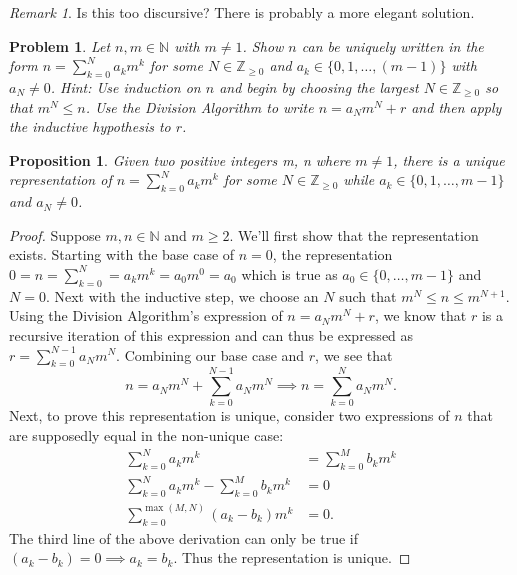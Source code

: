 \documentclass[12pt]{article}
\newtheorem*{prop}{Proposition}
\newtheorem{problem}{Problem}
\theoremstyle{remark}  %
\newtheorem*{remark}{Remark}
\begin{document}
    \begin{remark}
        Is this too discursive? There is probably a more elegant solution.
    \end{remark}
\vspace{.5em}

\setcounter{problem}{9}
    \begin{problem}
        Let $n,m\in \mathbb{N}$ with $m\neq 1$. Show $n$ can be uniquely written in the form $n=\sum_{k=0}^{N}a_km^k$ for some $N\in\mathbb{Z}_{\geq 0}$ and $a_k\in\{0,1,\dots,(m-1)\}$ with $a_N\neq0$. Hint: Use induction on $n$ and begin by choosing the largest $N\in \mathbb{Z}_{\geq 0}$ so that $m^N\leq n$. Use the Division Algorithm to write $n=a_Nm^N+r$ and then apply the inductive hypothesis to $r$.
    \end{problem}
    \begin{prop}
        Given two positive integers m, n where $m\neq 1$, there is a unique representation of $n=\sum_{k=0}^{N}a_km^k$ for some $N\in \mathbb{Z}_{\geq 0}$ while $a_k\in \{0,1,\dots,m-1\}$ and $a_N\neq 0$.
    \end{prop}
    \begin{proof}
        Suppose $m,n \in\mathbb{N}$ and $m\geq 2$. We'll first show that the representation exists. Starting with the base case of $n=0$, the representation $0=n=\sum_{k=0}^{N}=a_km^k=a_0m^0=a_0$ which is true as $a_0\in\{0,\dots,m-1\}$ and $N=0$. Next with the inductive step, we choose an $N$ such that $m^N\leq n \leq m^{N+1}$. Using the Division Algorithm's expression of $n=a_Nm^N+r$, we know that $r$ is a recursive iteration of this expression and can thus be expressed as $r=\sum_{k=0}^{N-1}a_Nm^N$. Combining our base case and $r$, we see that $$n=a_Nm^N+\sum_{k=0}^{N-1}a_Nm^N\implies n=\sum_{k=0}^{N}a_Nm^N.$$ Next, to prove this representation is unique, consider two expressions of $n$ that are supposedly equal in the non-unique case:
        \begin{align*}
            \sum_{k=0}^{N}a_km^k &= \sum_{k=0}^{M}b_km^k \\
            \sum_{k=0}^{N}a_km^k-\sum_{k=0}^{M}b_km^k &=0 \\
            \sum_{k=0}^{\max(M,N)}(a_k-b_k)m^k &= 0.
        \end{align*}
        The third line of the above derivation can only be true if $(a_k-b_k)=0\implies a_k=b_k$. Thus the representation is unique.
    \end{proof}
\vspace{.5em}
\end{document}
